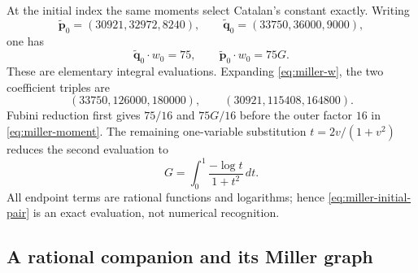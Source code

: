 At the initial index the same moments select Catalan's constant exactly.
Writing
\[
 \widetilde{\boldsymbol p}_0=(30921,32972,8240),\qquad
 \widetilde{\boldsymbol q}_0=(33750,36000,9000),
\]
one has
\begin{equation}\label{eq:miller-initial-pair}
       \widetilde{\boldsymbol q}_0\cdot w_0=75,\qquad
       \widetilde{\boldsymbol p}_0\cdot w_0=75G .
\end{equation}
These are elementary integral evaluations.  Expanding
\eqref{eq:miller-w}, the two coefficient triples are
\[
 (33750,126000,180000),\qquad
 (30921,115408,164800).
\]
Fubini reduction first gives $75/16$ and $75G/16$ before the outer factor
$16$ in \eqref{eq:miller-moment}.  The remaining one-variable substitution
$t=2v/(1+v^2)$ reduces the second evaluation to
\[
              G=\int_0^1\frac{-\log t}{1+t^2}\,dt.
\]
All endpoint terms are rational functions and logarithms; hence
\eqref{eq:miller-initial-pair} is an exact evaluation, not numerical
recognition.

\subsection{A rational companion and its Miller graph}

